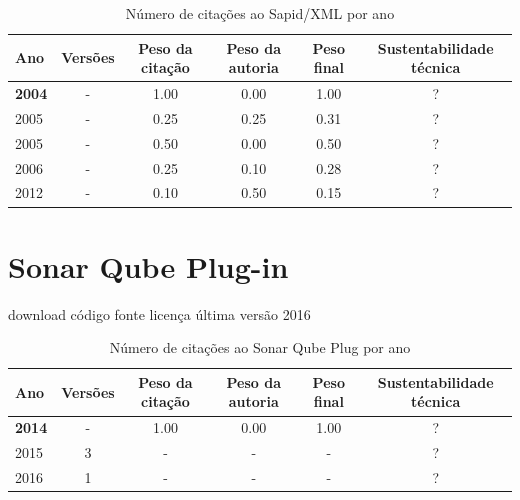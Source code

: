 \begin{table}[H]
\caption{Número de citações ao Sapid/XML por ano}
\centering
\begin{tabular}{| l | c | c | c | c | c |}
  \hline
  Ano & Versões & Peso da citação & Peso da autoria & Peso final & Sustentabilidade técnica \\
  \hline
            {\bf 2004}
          &
          -
          &
          1.00
          &
          0.00
          &
            {\color{blue} 1.00}
          &
          ?
          \\
\hline
            2005
          &
          -
          &
          0.25
          &
          0.25
          &
            {\color{red} 0.31}
          &
          ?
          \\
            2005
          &
          -
          &
          0.50
          &
          0.00
          &
            {\color{blue} 0.50}
          &
          ?
          \\
\hline
            2006
          &
          -
          &
          0.25
          &
          0.10
          &
            {\color{red} 0.28}
          &
          ?
          \\
\hline
            2012
          &
          -
          &
          0.10
          &
          0.50
          &
            {\color{red} 0.15}
          &
          ?
          \\
\hline
\end{tabular}
\end{table}



\section{Sonar Qube Plug-in}
\checkmark download
\checkmark código fonte
\checkmark licença
\checkmark última versão 2016



\begin{table}[H]
\caption{Número de citações ao Sonar Qube Plug por ano}
\centering
\begin{tabular}{| l | c | c | c | c | c |}
  \hline
  Ano & Versões & Peso da citação & Peso da autoria & Peso final & Sustentabilidade técnica \\
  \hline
            {\bf 2014}
          &
          -
          &
          1.00
          &
          0.00
          &
            {\color{blue} 1.00}
          &
          ?
          \\
\hline
        2015 & 3 & - & - & - & ? \\
\hline
        2016 & 1 & - & - & - & ? \\
\hline
\end{tabular}
\end{table}



